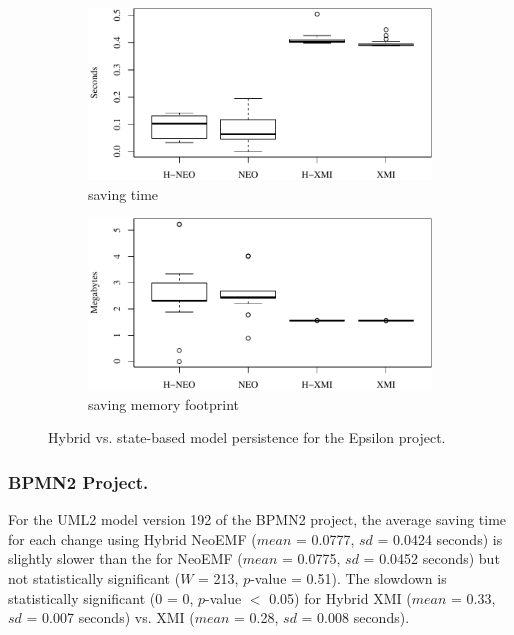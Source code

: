 \documentclass{llncs}
\begin{document}
\begin{figure}[ht]
    \begin{subfigure}{0.49\linewidth}
        \includegraphics[width=\linewidth]{images/save_time_epsilon}
        \caption{saving time}
        \label{fig:save_time_epsilon}
    \end{subfigure}
    \begin{subfigure}{0.49\linewidth}
        \includegraphics[width=\linewidth]{images/save_memory_epsilon}
        \caption{saving memory footprint}
        \label{fig:save_memory_epsilon}
    \end{subfigure}
\caption{Hybrid vs. state-based model persistence for the Epsilon project.}
\end{figure}

\subsubsection{BPMN2 Project.}
\label{sec:model_saving_time_bpmn2}
For the UML2 model version 192 of the BPMN2 project, the average saving time for each change using Hybrid NeoEMF ($mean$ = 0.0777, $sd$ = 0.0424 seconds) is slightly slower than the for NeoEMF ($mean$ = 0.0775, $sd$ = 0.0452 seconds) but not statistically significant ($W$ = 213, $p$-value = 0.51). The slowdown is statistically significant ($0$ = 0, $p$-value $<$ 0.05) for Hybrid XMI ($mean$ = 0.33, $sd$ = 0.007 seconds) vs. XMI ($mean$ = 0.28, $sd$ = 0.008 seconds). 
\end{document}
